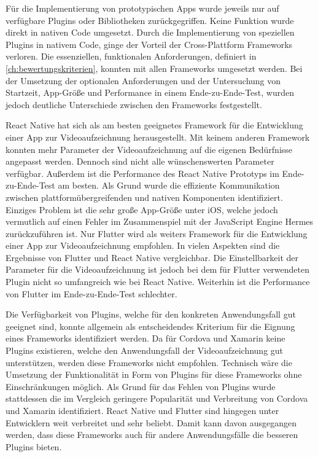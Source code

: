 Für die Implementierung von prototypischen Apps wurde jeweils nur auf verfügbare Plugins oder Bibliotheken zurückgegriffen.
Keine Funktion wurde direkt in nativen Code umgesetzt.
Durch die Implementierung von speziellen Plugins in nativem Code, ginge der Vorteil der Cross-Plattform Frameworks verloren.
Die essenziellen, funktionalen Anforderungen, definiert in \autoref{ch:bewertungskriterien}, konnten mit allen Frameworks umgesetzt werden.
Bei der Umsetzung der optionalen Anforderungen und der Untersuchung von Startzeit, App-Größe und Performance in einem Ende-zu-Ende-Test, wurden jedoch deutliche Unterschiede zwischen den Frameworks festgestellt.

React Native hat sich als am besten geeignetes Framework für die Entwicklung einer App zur Videoaufzeichnung herausgestellt.
Mit keinem anderen Framework konnten mehr Parameter der Videoaufzeichnung auf die eigenen Bedürfnisse angepasst werden.
Dennoch sind nicht alle wünschenswerten Parameter verfügbar.
Außerdem ist die Performance des React Native Prototyps im Ende-zu-Ende-Test am besten.
Als Grund wurde die effiziente Kommunikation zwischen plattformübergreifenden und nativen Komponenten identifiziert.
Einziges Problem ist die sehr große App-Größe unter iOS, welche jedoch vermutlich auf einen Fehler im Zusammenspiel mit der JavaScript Engine Hermes zurückzuführen ist.
Nur Flutter wird als weiters Framework für die Entwicklung einer App zur Videoaufzeichnung empfohlen.
In vielen Aspekten sind die Ergebnisse von Flutter und React Native vergleichbar.
Die Einstellbarkeit der Parameter für die Videoaufzeichnung ist jedoch bei dem für Flutter verwendeten Plugin nicht so umfangreich wie bei React Native.
Weiterhin ist die Performance von Flutter im Ende-zu-Ende-Test schlechter.

Die Verfügbarkeit von Plugins, welche für den konkreten Anwendungsfall gut geeignet sind, konnte allgemein als entscheidendes Kriterium für die Eignung eines Frameworks identifiziert werden.
Da für Cordova und Xamarin keine Plugins existieren, welche den Anwendungsfall der Videoaufzeichnung gut unterstützen, werden diese Frameworks nicht empfohlen.
Technisch wäre die Umsetzung der Funktionalität in Form von Plugins für diese Frameworks ohne Einschränkungen möglich.
Als Grund für das Fehlen von Plugins wurde stattdessen die im Vergleich geringere Popularität und Verbreitung von Cordova und Xamarin identifiziert.
React Native und Flutter sind hingegen unter Entwicklern weit verbreitet und sehr beliebt.
Damit kann davon ausgegangen werden, dass diese Frameworks auch für andere Anwendungsfälle die besseren Plugins bieten.


